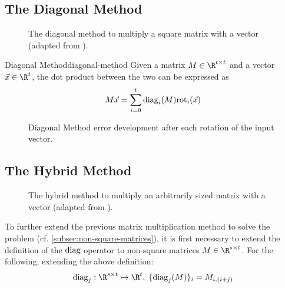 \subsection{The Diagonal Method}
\begin{figure}[H]
  \centering
  \caption{The diagonal method to multiply a square matrix with a vector (adapted from \cite{2018-gazelle}).}
\end{figure}


\begin{theorem}{Diagonal Method}{diagonal-method}
  Given a matrix $M \in \R^{t \times t}$ and a vector $\vec{x} \in \R^t$,
  the dot product between the two can be expressed as
  \begin{equation*}
    M \vec{x} = \sum_{i=0}^t \mathrm{diag}_i(M) \mathrm{rot}_i(\vec{x})
  \end{equation*}
\end{theorem}

\begin{figure}[H]
  \centering
  \pgfplotsset{/pgfplots/group/.cd,vertical sep=2.0cm}
  \caption{Diagonal Method error development after each rotation of the input vector.}
  \label{fig:rotation-error}
\end{figure}


\subsection{The Hybrid Method}
\begin{figure}[H]
  \centering
  \caption{The hybrid method to multiply an arbitrarily sized matrix with a vector (adapted from \cite{2018-gazelle}).}
\end{figure}
To further extend the previous matrix multiplication method to solve the problem
(cf. \autoref{subsec:non-square-matrices}), it is first necessary to extend the definition of the $\mathrm{diag}$ operator to non-square matrices $M \in \R^{s \times t}$.
For the following, extending the above definition:
$$\diag_j: \R^{s \times t} \mapsto \R^t, \; \{\diag_j(M)\}_i = M_{i, (i+j)}$$

